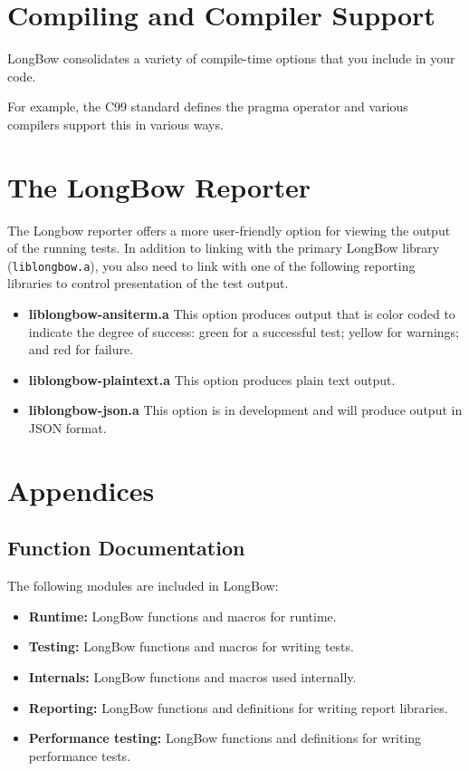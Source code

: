 \documentclass[12pt]{article} %
\begin{document}
\section {Compiling and Compiler Support}
LongBow consolidates a variety of compile-time options that you include in your code.

For example, the C99 standard defines the pragma operator and various compilers support this in various ways.

\section{The LongBow Reporter}  
The Longbow reporter offers a more user-friendly option for viewing the output of the running tests. In addition to linking with the primary LongBow library ({\tt liblongbow.a}), you also need to link with one of the following reporting libraries to control presentation of the test output.
\begin{itemize}
\item {\bf liblongbow-ansiterm.a} This option produces output that is color coded to indicate the degree of success: green for a successful test; yellow for warnings; and red for failure.
\item {\bf liblongbow-plaintext.a} This option produces plain text output.
\item {\bf liblongbow-json.a} This option is in development and will produce output in JSON format.
\end{itemize}



\section {Appendices}
\subsection {Function Documentation}
The following modules are included in LongBow:
\begin {itemize}
\item \textbf{Runtime:}	LongBow functions and macros for runtime.
\item \textbf{Testing:}	 LongBow functions and macros for writing tests.
\item \textbf{Internals:} LongBow functions and macros used internally.
\item \textbf{Reporting:}	LongBow functions and definitions for writing report libraries.
\item \textbf{Performance testing:} LongBow functions and definitions for writing performance tests.
\end{itemize}
\end{document}
